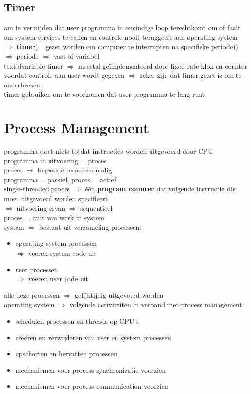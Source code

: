 \documentclass{report}
\begin{document}
\subsection{Timer}
om te vermijden dat user programma in oneindige loop terechtkomt om of faalt om system services te callen en controle nooit teruggeeft aan operating system
\\$\Rightarrow$ \textbf{timer}(= gezet worden om computer te interrupten na specifieke periode))
\\$\Rightarrow$ periode $\Rightarrow$ vast of variabel
\\textbf{variable timer} $\Rightarrow$ meestal ge\"implementeerd door fixed-rate klok en counter
\\voordat controle aan user wordt gegeven $\Rightarrow$ zeker zijn dat timer gezet is om te onderbreken
\\timer gebruiken om te voorkomen dat user programma te lang runt

\section{Process Management}
programma doet niets totdat instructies worden uitgevoerd door CPU
\\programma in uitvoering = proces
\\proces $\Rightarrow$ bepaalde resources nodig
\\programma = passief, proces = actief
\\single-threaded proces $\Rightarrow$ \'e\'en \textbf{program counter} dat volgende instructie die moet uitgevoerd worden specifieert
\\$\Rightarrow$ uitvoering ervan $\Rightarrow$ sequentieel 
\\proces = unit van work in system
\\system $\Rightarrow$ bestaat uit verzameling processen:
\begin{itemize}
\item operating-system processen
\\$\Rightarrow$ voeren system code uit
\item user processen
\\$\Rightarrow$ voeren user code uit
\end{itemize}
alle deze processen $\Rightarrow$ gelijktijdig uitgevoerd worden
\\operating system $\Rightarrow$ volgende activiteiten in verband met process management:
\begin{itemize}
\item schedulen processen en threads op CPU's
\item creëren en verwijderen van user en system processen
\item opschorten en hervatten processen
\item mechanismen voor process synchronizatie voorzien
\item mechanismen voor process communication voorzien
\end{itemize}
\end{document}
